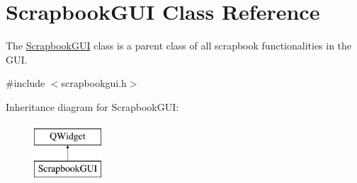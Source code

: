 \hypertarget{classScrapbookGUI}{}\section{Scrapbook\+G\+UI Class Reference}
\label{classScrapbookGUI}


The \hyperlink{classScrapbookGUI}{Scrapbook\+G\+UI} class is a parent class of all scrapbook functionalities in the G\+UI.  




{\ttfamily \#include $<$scrapbookgui.\+h$>$}

Inheritance diagram for Scrapbook\+G\+UI\+:\begin{figure}[H]
\begin{center}
\leavevmode
\includegraphics[height=2.000000cm]{classScrapbookGUI}
\end{center}
\end{figure}
